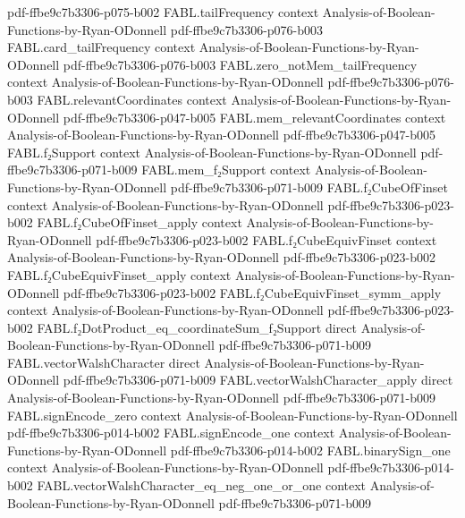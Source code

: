 \begin{theorem}
  {pdf-ffbe9c7b3306-p075-b002}
\proofstep
  {FABL.tailFrequency}
  {context}
  {Analysis-of-Boolean-Functions-by-Ryan-ODonnell}
  {pdf-ffbe9c7b3306-p076-b003}
\proofstep
  {FABL.card_tailFrequency}
  {context}
  {Analysis-of-Boolean-Functions-by-Ryan-ODonnell}
  {pdf-ffbe9c7b3306-p076-b003}
\proofstep
  {FABL.zero_notMem_tailFrequency}
  {context}
  {Analysis-of-Boolean-Functions-by-Ryan-ODonnell}
  {pdf-ffbe9c7b3306-p076-b003}
\proofstep
  {FABL.relevantCoordinates}
  {context}
  {Analysis-of-Boolean-Functions-by-Ryan-ODonnell}
  {pdf-ffbe9c7b3306-p047-b005}
\proofstep
  {FABL.mem_relevantCoordinates}
  {context}
  {Analysis-of-Boolean-Functions-by-Ryan-ODonnell}
  {pdf-ffbe9c7b3306-p047-b005}
\proofstep
  {FABL.f₂Support}
  {context}
  {Analysis-of-Boolean-Functions-by-Ryan-ODonnell}
  {pdf-ffbe9c7b3306-p071-b009}
\proofstep
  {FABL.mem_f₂Support}
  {context}
  {Analysis-of-Boolean-Functions-by-Ryan-ODonnell}
  {pdf-ffbe9c7b3306-p071-b009}
\proofstep
  {FABL.f₂CubeOfFinset}
  {context}
  {Analysis-of-Boolean-Functions-by-Ryan-ODonnell}
  {pdf-ffbe9c7b3306-p023-b002}
\proofstep
  {FABL.f₂CubeOfFinset_apply}
  {context}
  {Analysis-of-Boolean-Functions-by-Ryan-ODonnell}
  {pdf-ffbe9c7b3306-p023-b002}
\proofstep
  {FABL.f₂CubeEquivFinset}
  {context}
  {Analysis-of-Boolean-Functions-by-Ryan-ODonnell}
  {pdf-ffbe9c7b3306-p023-b002}
\proofstep
  {FABL.f₂CubeEquivFinset_apply}
  {context}
  {Analysis-of-Boolean-Functions-by-Ryan-ODonnell}
  {pdf-ffbe9c7b3306-p023-b002}
\proofstep
  {FABL.f₂CubeEquivFinset_symm_apply}
  {context}
  {Analysis-of-Boolean-Functions-by-Ryan-ODonnell}
  {pdf-ffbe9c7b3306-p023-b002}
\proofstep
  {FABL.f₂DotProduct_eq_coordinateSum_f₂Support}
  {direct}
  {Analysis-of-Boolean-Functions-by-Ryan-ODonnell}
  {pdf-ffbe9c7b3306-p071-b009}
\proofstep
  {FABL.vectorWalshCharacter}
  {direct}
  {Analysis-of-Boolean-Functions-by-Ryan-ODonnell}
  {pdf-ffbe9c7b3306-p071-b009}
\proofstep
  {FABL.vectorWalshCharacter_apply}
  {direct}
  {Analysis-of-Boolean-Functions-by-Ryan-ODonnell}
  {pdf-ffbe9c7b3306-p071-b009}
\proofstep
  {FABL.signEncode_zero}
  {context}
  {Analysis-of-Boolean-Functions-by-Ryan-ODonnell}
  {pdf-ffbe9c7b3306-p014-b002}
\proofstep
  {FABL.signEncode_one}
  {context}
  {Analysis-of-Boolean-Functions-by-Ryan-ODonnell}
  {pdf-ffbe9c7b3306-p014-b002}
\proofstep
  {FABL.binarySign_one}
  {context}
  {Analysis-of-Boolean-Functions-by-Ryan-ODonnell}
  {pdf-ffbe9c7b3306-p014-b002}
\proofstep
  {FABL.vectorWalshCharacter_eq_neg_one_or_one}
  {context}
  {Analysis-of-Boolean-Functions-by-Ryan-ODonnell}
  {pdf-ffbe9c7b3306-p071-b009}

\end{theorem}

